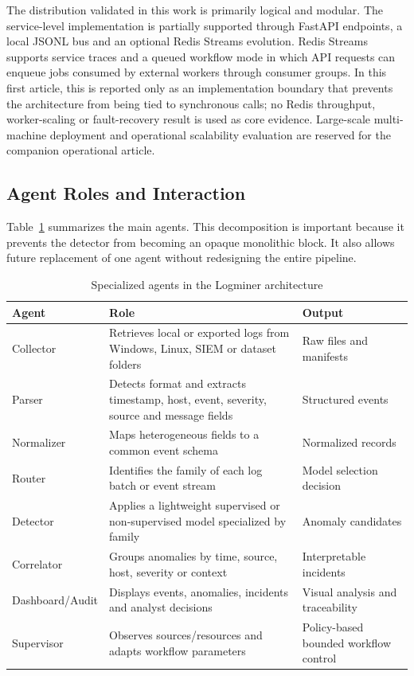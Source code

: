 \documentclass[conference]{IEEEtran}
\newcommand{\logminer}{Logminer}
\begin{document}
The distribution validated in this work is primarily logical and modular. The service-level implementation is partially supported through FastAPI endpoints, a local JSONL bus and an optional Redis Streams evolution. Redis Streams supports service traces and a queued workflow mode in which API requests can enqueue jobs consumed by external workers through consumer groups. In this first article, this is reported only as an implementation boundary that prevents the architecture from being tied to synchronous calls; no Redis throughput, worker-scaling or fault-recovery result is used as core evidence. Large-scale multi-machine deployment and operational scalability evaluation are reserved for the companion operational article.

\subsection{Agent Roles and Interaction}
Table~\ref{tab:agents} summarizes the main agents. This decomposition is important because it prevents the detector from becoming an opaque monolithic block. It also allows future replacement of one agent without redesigning the entire pipeline.

\begin{table}[t]
\caption{Specialized agents in the \logminer{} architecture}
\label{tab:agents}
\centering
\scriptsize
\begin{tabularx}{\linewidth}{p{1.5cm}X X}
\toprule
\textbf{Agent} & \textbf{Role} & \textbf{Output} \\
\midrule
Collector & Retrieves local or exported logs from Windows, Linux, SIEM or dataset folders & Raw files and manifests \\
Parser & Detects format and extracts timestamp, host, event, severity, source and message fields & Structured events \\
Normalizer & Maps heterogeneous fields to a common event schema & Normalized records \\
Router & Identifies the family of each log batch or event stream & Model selection decision \\
Detector & Applies a lightweight supervised or non-supervised model specialized by family & Anomaly candidates \\
Correlator & Groups anomalies by time, source, host, severity or context & Interpretable incidents \\
Dashboard/Audit & Displays events, anomalies, incidents and analyst decisions & Visual analysis and traceability \\
Supervisor & Observes sources/resources and adapts workflow parameters & Policy-based bounded workflow control \\
\bottomrule
\end{tabularx}
\end{table}
\end{document}
